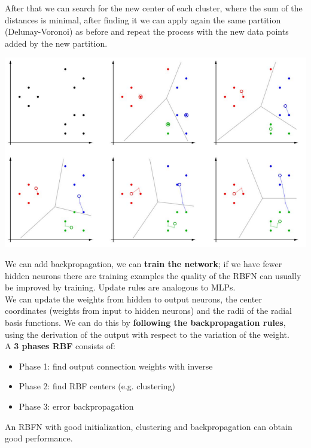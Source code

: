 \newpage

After that we can search for the new center of each cluster, where the sum of the distances is minimal, after finding it we can apply again the same partition (Delunay-Voronoi) as before and repeat the process with the new data points added by the new partition.
\begin{center}
	\includegraphics[width=0.9\columnwidth]{img/NN/clustering3}
\end{center}

We can add backpropagation, we can \textbf{train the network}; if we have fewer hidden neurons there are training examples the quality of the RBFN can usually be improved by training. Update rules are analogous to MLPs.\\

We can update the weights from hidden to output neurons, the center coordinates (weights from input to hidden neurons) and the radii of the radial basis functions. We can do this by \textbf{following the backpropagation rules}, using the derivation of the output with respect to the variation of the weight.\\

A \textbf{3 phases RBF} consists of:
\begin{itemize}
	\item Phase 1: find output connection weights with inverse
	\item Phase 2: find RBF centers (e.g. clustering)
	\item Phase 3: error backpropagation
\end{itemize}
An RBFN with good initialization, clustering and backpropagation can obtain good performance.\\


\newpage

